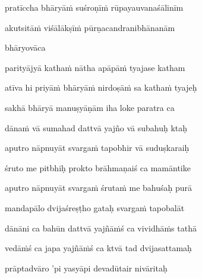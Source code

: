 pratīccha bhāryā\.m suśroṇī\.m rūpayauvanaśālinīm\thinspace{\danda} \dontdisplaylinenum

akutsitā\.m viśālākṣī\.m pūrṇacandranibhānanām \veg\dontdisplaylinenum

bhāryovāca\thinspace{\dandab} \dontdisplaylinenum

parityājyā katha\.m nātha apāpā\.m tyajase katham \danda\dontdisplaylinenum

atīva hi priyā\.m bhāryā\.m nirdoṣā\.m sa katha\.m tyajeḥ \veg\dontdisplaylinenum

sakhā bhāryā manuṣyāṇām iha loke paratra ca\thinspace{\dandab} \dontdisplaylinenum

dāna\.m vā sumahad dattvā yajño vā subahuḥ ktaḥ \veg\dontdisplaylinenum

aputro nāpnuyāt svarga\.m tapobhir vā suduṣkaraiḥ\thinspace{\dandab} \dontdisplaylinenum

śruto me pitbhiḥ prokto brāhmaṇaiś ca mamāntike \veg\dontdisplaylinenum

aputro nāpnuyāt svarga\.m śruta\.m me bahuśaḥ purā\thinspace{\dandab} \dontdisplaylinenum

mandapālo dvijaśreṣṭho gataḥ svarga\.m tapobalāt \veg\dontdisplaylinenum

dānāni ca bahūn dattvā yajñā\.mś ca vividhā\.ms tathā\thinspace{\dandab} \dontdisplaylinenum

vedā\.mś ca japa yajñā\.mś ca ktvā tad dvijasattamaḥ \veg\dontdisplaylinenum

prāptadvāro 'pi yasyāpi devadūtair nivāritaḥ\thinspace{\dandab} \dontdisplaylinenum

